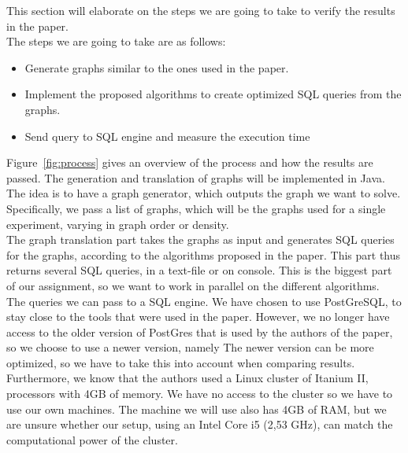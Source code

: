 This section will elaborate on the steps we are going to take to verify the results in the paper.\\

\noindent The steps we are going to take are as follows:

\begin{itemize}
	\item Generate graphs similar to the ones used in the paper.
	\item Implement the proposed algorithms to create optimized SQL queries from the graphs.
	\item Send query to SQL engine and measure the execution time
\end{itemize}

\noindent Figure~\ref{fig:process} gives an overview of the process and how the results are passed. The generation and translation of graphs will be implemented in Java. The idea is to have a graph generator, which outputs the graph we want to solve. Specifically, we pass a list of graphs, which will be the graphs used for a single experiment, varying in graph order or density. \\

The graph translation part takes the graphs as input and generates SQL queries for the graphs, according to the algorithms proposed in the paper. This part thus returns several SQL queries, in a text-file or on console. This is the biggest part of our assignment, so we want to work in parallel on the different algorithms. \\

The queries we can pass to a SQL engine. We have chosen to use PostGreSQL, to stay close to the tools that were used in the paper. However, we no longer have access to the older version of PostGres that is used by the authors of the paper, so we choose to use a newer version, namely %
The newer version can be more optimized, so we have to take this into account when comparing results. Furthermore, we know that the authors used a Linux cluster of Itanium II, processors with 4GB of memory. We have no access to the cluster so we have to use our own machines. The machine we will use also has 4GB of RAM, but we are unsure whether our setup, using an Intel Core i5 (2,53 GHz), can match the computational power of the cluster. %

